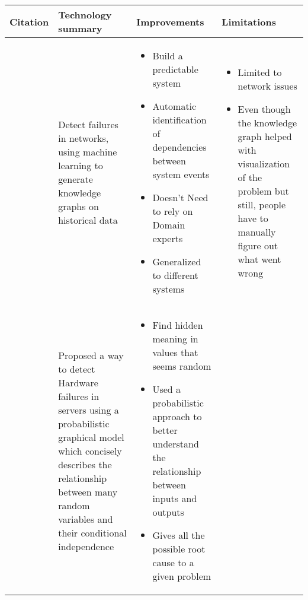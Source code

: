 \begin{longtable}{| p{20mm} | p{43mm} | p{43mm} | p{43mm} |}
\hline
  \textbf{Citation} &
  \textbf{Technology summary} &
  \textbf{Improvements} &
  \textbf{Limitations} \\ \hline
  \cite{gonzalez2017root} &
  Detect failures in networks, using machine learning to generate knowledge graphs on historical data &
  \vspace{-8mm}
  \begin{itemize}[leftmargin=*,noitemsep,nolistsep] 
    \item Build a predictable system
    \item Automatic identification of dependencies between system events
    \item Doesn't Need to rely on Domain experts
    \item Generalized to different systems
  \vspace{-7mm}
  \end{itemize} &
  \vspace{-8mm}
  \begin{itemize}[leftmargin=*,noitemsep,nolistsep] 
    \item Limited to network issues
    \item Even though the knowledge graph helped with visualization of the problem but still, people have to manually figure out what went wrong
  \vspace{-7mm}
  \end{itemize} \\ \hline
  \cite{chigurupati2017root} &
  Proposed a way to detect Hardware failures in servers using a probabilistic graphical model which concisely describes the relationship between many random variables and their conditional independence &
  \vspace{-8mm}
  \begin{itemize}[leftmargin=*,noitemsep,nolistsep] 
    \item Find hidden meaning in values that seems random
    \item Used a probabilistic approach to better understand the relationship between inputs and outputs
    \item Gives all the possible root cause to a given problem
  \vspace{-7mm}
  \end{itemize} &
  \vspace{-8mm}
  \begin{itemize}[leftmargin=*,noitemsep,nolistsep] 

\end{itemize}
\end{longtable}
